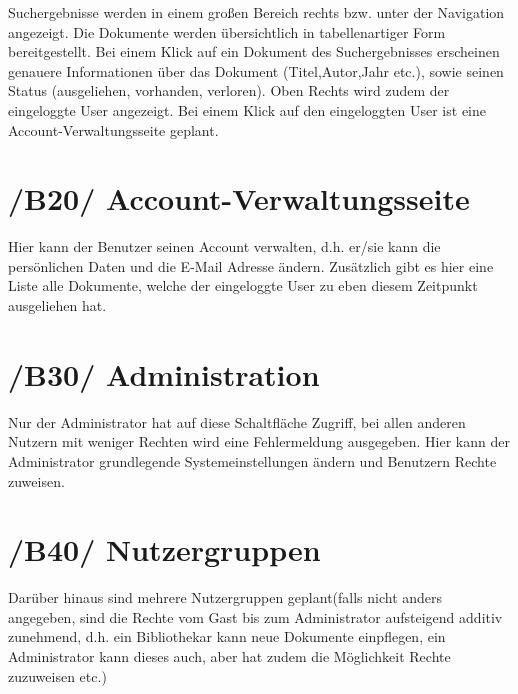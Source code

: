 Suchergebnisse werden in einem großen Bereich rechts bzw. unter der Navigation angezeigt. Die Dokumente werden übersichtlich in tabellenartiger Form bereitgestellt. Bei einem Klick auf ein Dokument des Suchergebnisses erscheinen genauere Informationen über das Dokument (Titel,Autor,Jahr etc.), sowie
seinen Status (ausgeliehen, vorhanden, verloren).
Oben Rechts wird zudem der eingeloggte User angezeigt.
Bei einem Klick auf den eingeloggten User ist eine Account-Verwaltungsseite geplant.



\section{/B20/ Account-Verwaltungsseite}
  	 	
Hier kann der Benutzer seinen Account verwalten, d.h. er/sie kann die persönlichen Daten und die E-Mail Adresse ändern.
Zusätzlich gibt es hier eine Liste alle Dokumente, welche der eingeloggte User zu eben diesem Zeitpunkt ausgeliehen hat.



\section{/B30/ Administration}

Nur der Administrator hat auf diese Schaltfläche Zugriff, bei allen anderen Nutzern mit weniger Rechten wird eine Fehlermeldung ausgegeben.
Hier kann der Administrator grundlegende Systemeinstellungen ändern und Benutzern Rechte zuweisen.



\section{/B40/ Nutzergruppen}

Darüber hinaus sind mehrere Nutzergruppen geplant(falls nicht anders angegeben, sind die Rechte vom Gast bis zum Administrator aufsteigend additiv zunehmend, d.h. ein Bibliothekar kann neue Dokumente einpflegen, ein Administrator kann dieses auch, aber hat zudem die Möglichkeit Rechte zuzuweisen etc.) 

